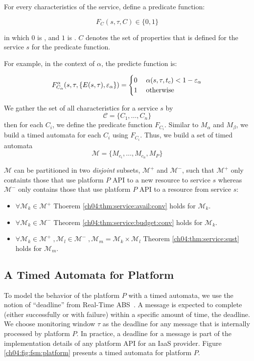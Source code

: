 For every characteristics of the service, define a predicate function:

\[
F_C(s,\tau, C) \in \{0, 1\}
\]

in which $0$ is , and $1$ is .
$C$ denotes the set of properties that is defined for the service $s$ for the predicate function.

For example, in the context of $\alpha$, the predicte function is:

\[
F^\alpha_{C_\alpha}(s, \tau, \{E(s,\tau), \varepsilon_\alpha\}) = \begin{cases}
0  &\;  \alpha(s,\tau,t_c) < 1 - \varepsilon_\alpha \\
1 &\; \textnormal{otherwise}
\end{cases}
\]

We gather the set of all characteristics for a service $s$ by
\[
\mathcal{C} = \{C_1, \ldots, C_n\}
 \]
then for each $C_i$, we define the predicate function $F_{C_i}$.
Similar to $M_\alpha$ and $M_\beta$, we build a timed automata for each $C_i$ using $F_{C_i}$. 
Thus, we build a set of timed automata
\[
\mathcal{M} = \{M_{c_i}, \ldots, M_{c_n}, M_P\}
\] 

$\mathcal{M}$ can be partitioned in two \emph{disjoint} subsets, $\mathcal{M}^+$ and $\mathcal{M}^-$, such that $\mathcal{M}^+$ only containts those that use platform $P$ API to  a new resource to service $s$ whereas $\mathcal{M}^-$ only contains those that use platform $P$ API to  a resource from service $s$:
\begin{itemize}
  \item $\forall \mathcal{M}_k \in \mathcal{M}^+$ Thoerem \ref{ch04:thm:service:avail:conv} holds for $\mathcal{M}_k$.
  \item $\forall \mathcal{M}_k \in \mathcal{M}^-$ Theorem \ref{ch04:thm:service:budget:conv} holds for $\mathcal{M}_k$.
  \item $\forall \mathcal{M}_k \in \mathcal{M}^+ \; , \mathcal{M}_l \in \mathcal{M}^- \;, \mathcal{M}_m = \mathcal{M}_k \times \mathcal{M}_l$ Theorem \ref{ch04:thm:service:sust} holds for $\mathcal{M}_m$. 
\end{itemize}

\subsection{A Timed Automata for Platform} 
\label{ch04:sec:automata:platform}

To model the behavior of the platform $P$ with a timed automata, we use the notion of ``deadline'' from Real-Time ABS~\cite{JaghooriBCS09,bjork2013:rtabs}.
A message is expected to complete (either successfully or with failure) within a specific amount of time, the deadline.
We choose monitoring window $\tau$ as the deadline for any message that is internally processed by platform $P$.
In practice, a deadline for a message is part of the implementation details of any platform API for an IaaS provider.
Figure \ref{ch04:fig:fsm:platform} presents a timed automata for platform $P$.

